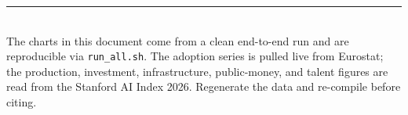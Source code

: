 \documentclass[11pt,a4paper]{article}
\newcommand{\code}[1]{\texttt{#1}}
\begin{document}
\vfill
\noindent\rule{\linewidth}{0.4pt}\\[2pt]
{\small The charts in this document come from a clean end-to-end run and are
reproducible via \code{run\_all.sh}. The adoption series is pulled live from
Eurostat; the production, investment, infrastructure, public-money, and talent
figures are read from the Stanford AI Index 2026. Regenerate the data and
re-compile before citing.}
\end{document}
